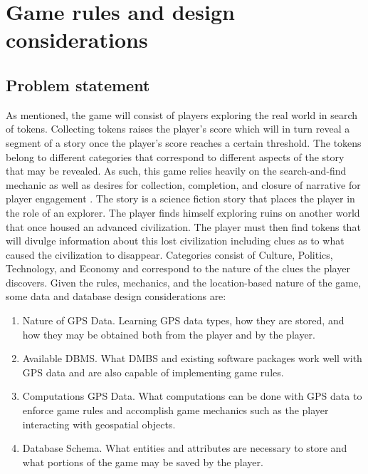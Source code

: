 \documentclass[conference]{IEEEtran}
\begin{document}
\section{Game rules and design considerations}
\subsection{Problem statement}
As mentioned, the game will consist of players exploring the real world in search of tokens. Collecting tokens raises the player’s score which will in turn reveal a segment of a story once the player’s score reaches a certain threshold. The tokens belong to different categories that correspond to different aspects of the story that may be revealed. As such, this game relies heavily on the search-and-find mechanic as well as desires for collection, completion, and closure of narrative for player engagement \cite{game-methodology, location-based-games}. 
The story is a science fiction story that places the player in the role of an explorer. The player finds himself exploring ruins on another world that once housed an advanced civilization. The player must then find tokens that will divulge information about this lost civilization including clues as to what caused the civilization to disappear. Categories consist of Culture, Politics, Technology, and Economy and correspond to the nature of the clues the player discovers. 
Given the rules, mechanics, and the location-based nature of the game, some data and database design considerations are:

\begin{enumerate}
	\item Nature of GPS Data. Learning GPS data types, how they are stored, and how they may be obtained both from the player and by the player.
	\item Available DBMS. What DMBS and existing software packages work well with GPS data and are also capable of implementing game rules.
	\item Computations GPS Data. What computations can be done with GPS data to enforce game rules and accomplish game mechanics such as the player interacting with geospatial objects.
	\item Database Schema. What entities and attributes are necessary to store and what portions of the game may be saved by the player.
\end{enumerate}
	
\end{document}
